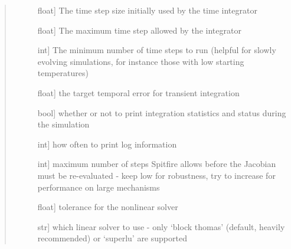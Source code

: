 \documentclass[letterpaper,10pt,english]{sphinxmanual}
\begin{document}
\begin{fulllineitems}
\begin{fulllineitems}
\begin{quote}
\begin{description}
\begin{description}
\item[{}] \leavevmode{[}float{]}
The time step size initially used by the time integrator

\item[{}] \leavevmode{[}float{]}
The maximum time step allowed by the integrator

\item[{}] \leavevmode{[}int{]}
The minimum number of time steps to run (helpful for slowly evolving simulations, for instance those with low starting temperatures)

\item[{}] \leavevmode{[}float{]}
the target temporal error for transient integration

\item[{}] \leavevmode{[}bool{]}
whether or not to print integration statistics and status during the simulation

\item[{}] \leavevmode{[}int{]}
how often to print log information

\item[{}] \leavevmode{[}int{]}
maximum number of steps Spitfire allows before the Jacobian must be re-evaluated - keep low for robustness, try to increase for performance on large mechanisms

\item[{}] \leavevmode{[}float{]}
tolerance for the nonlinear solver

\item[{}] \leavevmode{[}str{]}
which linear solver to use - only ‘block thomas’ (default, heavily recommended) or ‘superlu’ are supported

\end{description}

\end{description}\end{quote}

\end{fulllineitems}



\end{fulllineitems}
\end{document}
